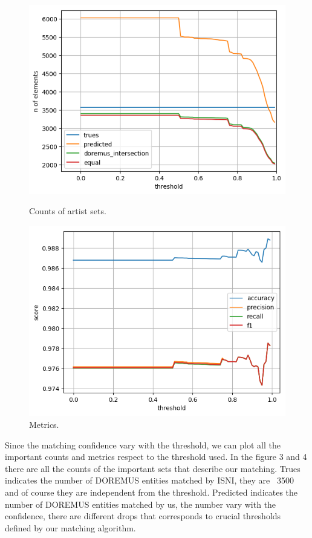 \documentclass[paper=a4, fontsize=11pt]{scrartcl}
\begin{document}
\begin{figure}[!htb]
  \centering
  \begin{minipage}[b]{0.49\textwidth}
    \includegraphics[width=\textwidth]{images/counts_artists.png}
    \caption{Counts of artist sets.}
  \end{minipage}
  \hfill
  \begin{minipage}[b]{0.49\textwidth}
    \includegraphics[width=\textwidth]{images/metrics_artists.png}
    \caption{Metrics.}
  \end{minipage}
\end{figure}

Since the matching confidence vary with the threshold, we can plot all the important counts and metrics respect to the threshold used.
In the figure 3 and 4 there are all the counts of the important sets that describe our matching.
Trues indicates the number of DOREMUS entities matched by ISNI, they are ~3500 and of course they are independent from the threshold.
Predicted indicates the number of DOREMUS entities matched by us, the number vary with the confidence, there are different drops that corresponds to crucial thresholds defined by our matching algorithm.
\end{document}
